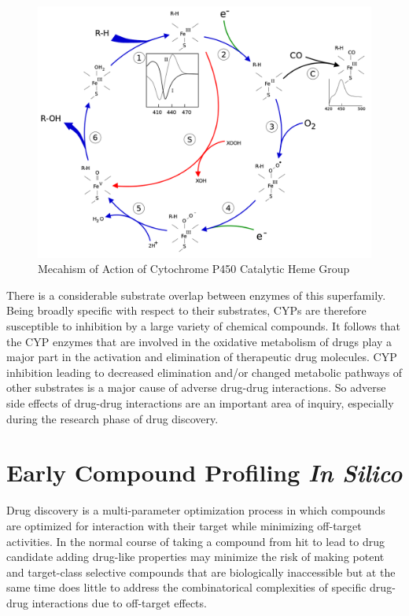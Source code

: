 \begin{figure}[h,t]
  \caption{Mecahism of Action of Cytochrome P450 Catalytic Heme Group}
  \centering
   \includegraphics[width=1\textwidth]{../img/P450MOA.png}
\end{figure}

There is a considerable substrate overlap between enzymes of this superfamily. Being broadly specific with respect to their substrates, CYPs are therefore susceptible to inhibition by a large variety of chemical compounds. It follows that the CYP enzymes that are involved in the oxidative metabolism of drugs play a major part in the activation and elimination of therapeutic drug molecules. CYP inhibition leading to decreased elimination and/or changed metabolic pathways of other substrates is a major cause of adverse drug-drug interactions. \cite{Lapins2013} So adverse side effects of drug-drug interactions are an important area of inquiry, especially during the research phase of drug discovery.


\section{Early Compound Profiling \textit{In Silico}}

Drug discovery is a multi-parameter optimization process in which compounds are optimized for interaction with their target while minimizing off-target activities. \cite{Zlokarnik2005} In the normal course of taking a compound from hit to lead to drug candidate adding drug-like properties may minimize the risk of making potent and target-class selective compounds that are biologically inaccessible but at the same time does little to address the combinatorical complexities of specific drug-drug interactions due to off-target effects.

